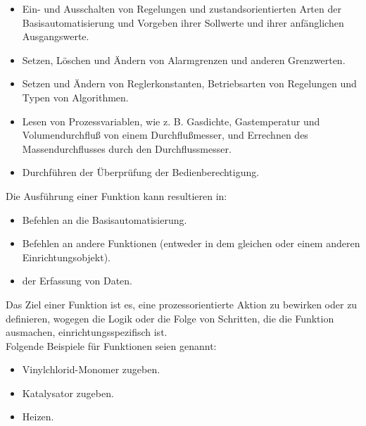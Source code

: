 \begin{itemize}
	\item Ein- und Ausschalten von Regelungen und zustandsorientierten Arten der Basisautomatisierung und Vorgeben ihrer Sollwerte und ihrer anfänglichen Ausgangswerte.
	\item Setzen, Löschen und Ändern von Alarmgrenzen und anderen Grenzwerten.
	\item Setzen und Ändern von Reglerkonstanten, Betriebsarten von Regelungen und Typen von Algorithmen.
	\item Lesen von Prozessvariablen, wie z. B. Gasdichte, Gastemperatur und Volumendurchfluß von einem Durchflußmesser, und Errechnen des Massendurchflusses durch den Durchflussmesser.
	\item Durchführen der Überprüfung der Bedienberechtigung.
\end{itemize}
Die Ausführung einer Funktion kann resultieren in:
\begin{itemize}
	\item Befehlen an die Basisautomatisierung.
	\item Befehlen an andere Funktionen (entweder in dem gleichen oder einem anderen Einrichtungsobjekt).
	\item der Erfassung von Daten.
\end{itemize}
Das Ziel einer Funktion ist es, eine prozessorientierte Aktion zu bewirken oder zu definieren, wogegen die Logik oder die Folge von Schritten, die die Funktion ausmachen, einrichtungsspezifisch ist.\\
Folgende Beispiele für Funktionen seien genannt:
\begin{itemize}
	\item Vinylchlorid-Monomer zugeben.
	\item Katalysator zugeben.
	\item Heizen.
\end{itemize}

